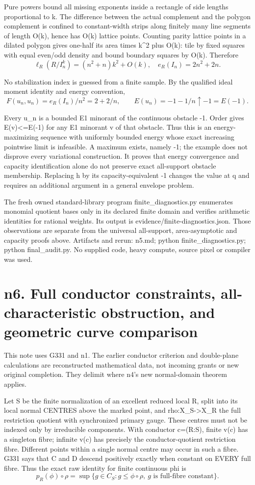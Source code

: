 \documentclass[11pt]{article}
\begin{document}
Pure powers bound all missing exponents inside a rectangle of side lengths proportional to k. The difference between the actual complement and the polygon complement is confined to constant-width strips along finitely many line segments of length O(k), hence has O(k) lattice points. Counting parity lattice points in a dilated polygon gives one-half its area times k\textasciicircum{}2 plus O(k): tile by fixed squares with equal even/odd density and bound boundary squares by O(k). Therefore
\[
\ell_R(R/I_n^k)=(n^2+n)k^2+O(k),\quad
e_R(I_n)=2n^2+2n.
\]

No stabilization index is guessed from a finite sample. By the qualified ideal moment identity and energy convention,
\[
F(u_n,u_n)=e_R(I_n)/n^2=2+2/n,
\qquad E(u_n)=-1-1/n\uparrow-1=E(-1).
\]

Every u\_n is a bounded E1 minorant of the continuous obstacle -1. Order gives E(v)<=E(-1) for any E1 minorant v of that obstacle. Thus this is an energy-maximizing sequence with uniformly bounded energy whose exact increasing pointwise limit is infeasible. A maximum exists, namely -1; the example does not disprove every variational construction. It proves that energy convergence and capacity identification alone do not preserve exact all-support obstacle membership. Replacing h by its capacity-equivalent -1 changes the value at q and requires an additional argument in a general envelope problem.

The fresh owned standard-library program finite\_diagnostics.py enumerates monomial quotient bases only in its declared finite domain and verifies arithmetic identities for rational weights. Its output is evidence/finite-diagnostics.json. Those observations are separate from the universal all-support, area-asymptotic and capacity proofs above. Artifacts and rerun: n5.md; python finite\_diagnostics.py; python final\_audit.py. No supplied code, heavy compute, source pixel or compiler was used.

\section{n6. Full conductor constraints, all-characteristic obstruction, and geometric curve comparison}

This note uses G331 and n1. The earlier conductor criterion and double-plane calculations are reconstructed mathematical data, not incoming grants or new original completion. They delimit where n4's new normal-domain theorem applies.

Let S be the finite normalization of an excellent reduced local R, split into its local normal CENTRES above the marked point, and rho:X\_S->X\_R the full restriction quotient with synchronized primary gauge. These centres must not be indexed only by irreducible components. With conductor c=(R:S), finite v(c) has a singleton fibre; infinite v(c) has precisely the conductor-quotient restriction fibre. Different points within a single normal centre may occur in such a fibre. G331 says that C and D descend positively exactly when constant on EVERY full fibre. Thus the exact raw identity for finite continuous phi is
\[
p_R(\phi)\circ\rho=\sup\{g\in C_S:g\le\phi\circ\rho,\ g\text{ is full-fibre constant}\}.
\]
\end{document}
